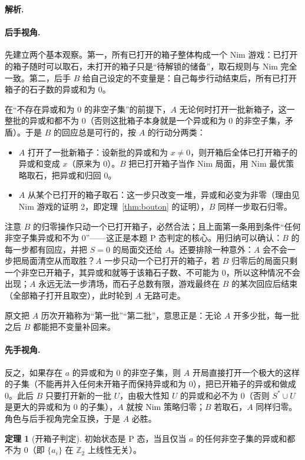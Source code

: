 \documentclass[UTF8,a4paper,11pt,oneside,openany,fontset=fandol]{ctexbook}
\theoremstyle{definition}
\newtheorem{theorem}[definition]{定理}
\newcommand{\Z}{\mathbb Z}
\newcommand{\sol}{\par\noindent\textbf{解析.}\ }
\begin{document}
\sol \paragraph{后手视角.} 先建立两个基本观察。第一，所有已打开的箱子整体构成一个 Nim 游戏：已打开的箱子随时可以取石，未打开的箱子只是“待解锁的储备”，取石规则与 Nim 完全一致。第二，后手 $B$ 给自己设定的不变量是：自己每步行动结束后，所有已打开箱子的石子数的异或和为 $0$。

在“不存在异或和为 $0$ 的非空子集”的前提下，$A$ 无论何时打开一批新箱子，这一整批的异或和都不为 $0$（否则这批箱子本身就是一个异或和为 $0$ 的非空子集，矛盾）。于是 $B$ 的回应总是可行的，按 $A$ 的行动分两类：
\begin{itemize}
\item $A$ 打开了一批新箱子：设新批的异或和为 $x\ne0$，则开箱后全体已打开箱子的异或和变成 $x$（原来为 $0$）。$B$ 把已打开箱子当作 Nim 局面，用 Nim 最优策略取石，把异或和归回 $0$。
\item $A$ 从某个已打开的箱子取石：这一步只改变一堆，异或和必变为非零（理由见 Nim 游戏的证明 2，即定理~\ref{thm:bouton} 的证明），$B$ 同样一步取石归零。
\end{itemize}
注意 $B$ 的归零操作只动一个已打开箱子，必然合法；且上面第一条用到条件“任何非空子集异或和不为 $0$”——这正是本题 P 态判定的核心。用归纳可以确认：$B$ 的每一步都有回应，并把 $S=0$ 的局面交还给 $A$。还要排除一种意外：$A$ 会不会一步把局面清空从而取胜？$A$ 一步只动一个已打开的箱子，若 $B$ 归零后的局面只剩一个非空已开箱子，其异或和就等于该箱石子数、不可能为 $0$，所以这种情况不会出现；$A$ 永远无法一步清场，而石子总数有限，游戏最终在 $B$ 的某次回应后结束（全部箱子打开且取空），此时轮到 $A$ 无路可走。

原文把 $A$ 历次开箱称为“第一批”“第二批”，意思正是：无论 $A$ 开多少批，每一批之后 $B$ 都能把不变量补回来。

\paragraph{先手视角.} 反之，如果存在 $a$ 的异或和为 $0$ 的非空子集，则 $A$ 开局直接打开一个极大的这样的子集（不能再并入任何未开箱子而保持异或和为 $0$），把已开箱子的异或和做成 $0$。此后 $B$ 只要打开新的一批 $U$，由极大性知 $U$ 的异或和必不为 $0$（否则 $S^*\cup U$ 是更大的异或和为 $0$ 的子集），$A$ 就按 Nim 策略归零；$B$ 若取石，$A$ 同样归零。角色与后手视角完全互换，于是 $A$ 必胜。

\begin{theorem}[开箱子判定]\label{thm:boxnim}
初始状态是 P 态，当且仅当 $a$ 的任何非空子集的异或和都不为 $0$（即 $\{a_i\}$ 在 $\Z_2$ 上线性无关）。
\end{theorem}
\end{document}
